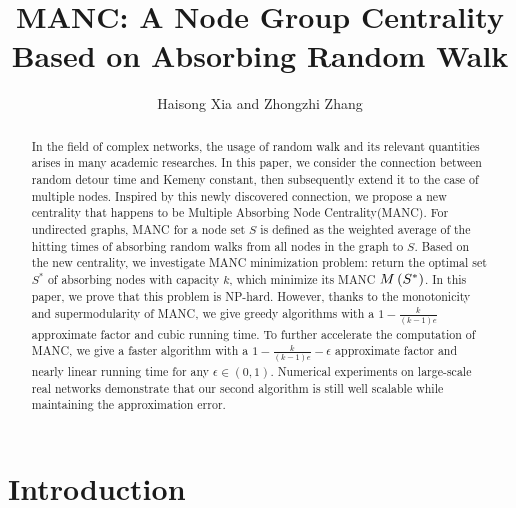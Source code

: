 \documentclass[sigconf]{acmart}
\begin{document}
\sloppy
\fancyhead{}
\title{MANC: A Node Group Centrality Based on Absorbing Random Walk}
\author{Haisong Xia and Zhongzhi Zhang \footnotemark}
\begin{abstract}
    In the field of complex networks, the usage of random walk and its relevant quantities arises in many academic researches.
    In this paper, we consider the connection between random detour time and Kemeny constant, then subsequently extend it to the case of multiple nodes.
    Inspired by this newly discovered connection, we propose a new centrality that happens to be Multiple Absorbing Node Centrality(MANC).
    For undirected graphs, MANC for a node set \(S\) is defined as the weighted average of the hitting times of absorbing random walks from all nodes in the graph to \(S\).
    Based on the new centrality, we investigate MANC minimization problem: return the optimal set \(S^*\) of absorbing nodes with capacity \(k\), which minimize its MANC \(M\left(S^*\right)\).
    In this paper, we prove that this problem is NP-hard.
    However, thanks to the monotonicity and supermodularity of MANC, we give greedy algorithms with a \(1-\frac{k}{(k-1)e}\) approximate factor and cubic running time.
    To further accelerate the computation of MANC, we give a faster algorithm with a \(1-\frac{k}{(k-1)e}-\epsilon\) approximate factor and nearly linear running time for any \(\epsilon\in(0,1)\).
    Numerical experiments on large-scale real networks demonstrate that our second algorithm is still well scalable while maintaining the approximation error.
\end{abstract}
\maketitle
\renewcommand{\thefootnote}{*}

\section{Introduction}\label{sec:intro}
\end{document}
